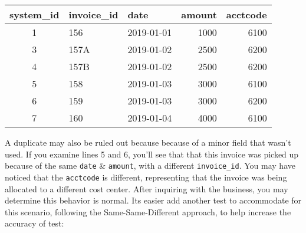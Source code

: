 \documentclass[
]{book}
\begin{document}
\captionsetup[table]{labelformat=empty,skip=1pt}
\begin{longtable}{cllrr}
\toprule
system\_id & invoice\_id & date & amount & acctcode \\ 
\midrule
1 & 156 & 2019-01-01 & 1000 & 6100 \\ 
3 & 157A & 2019-01-02 & 2500 & 6200 \\ 
4 & 157B & 2019-01-02 & 2500 & 6200 \\ 
5 & 158 & 2019-01-03 & 3000 & 6100 \\ 
6 & 159 & 2019-01-03 & 3000 & 6200 \\ 
7 & 160 & 2019-01-04 & 4000 & 6100 \\ 
\bottomrule
\end{longtable}

A duplicate may also be ruled out because because of a minor field that wasn't used. If you examine lines 5 and 6, you'll see that that this invoice was picked up because of the same \texttt{date} \& \texttt{amount}, with a different \texttt{invoice\_id}. You may have noticed that the \texttt{acctcode} is different, representing that the invoice was being allocated to a different cost center. After inquiring with the business, you may determine this behavior is normal. Its easier add another test to accommodate for this scenario, following the Same-Same-Different approach, to help increase the accuracy of test:
\end{document}
